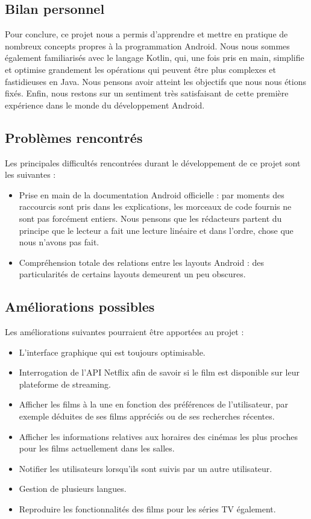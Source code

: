 \subsection{Bilan personnel}
Pour conclure, ce projet nous a permis d'apprendre et mettre en pratique de nombreux concepts propres à la programmation Android. Nous nous sommes également familiarisés avec le langage Kotlin, qui, une fois pris en main, simplifie et optimise grandement les opérations qui peuvent être plus complexes et fastidieuses en Java. Nous pensons avoir atteint les objectifs que nous nous étions fixés. Enfin, nous restons sur un sentiment très satisfaisant de cette première expérience dans le monde du développement Android.

\subsection{Problèmes rencontrés}
Les principales difficultés rencontrées durant le développement de ce projet sont les suivantes :
\begin{itemize}
    \item Prise en main de la documentation Android officielle : par moments des raccourcis sont pris dans les explications, les morceaux de code fournis ne sont pas forcément entiers. Nous pensons que les rédacteurs partent du principe que le lecteur a fait une lecture linéaire et dans l'ordre, chose que nous n'avons pas fait.
    \item Compréhension totale des relations entre les layouts Android : des particularités de certains layouts demeurent un peu obscures.
\end{itemize}

\subsection{Améliorations possibles}
Les améliorations suivantes pourraient être apportées au projet :
\begin{itemize}
    \item L'interface graphique qui est toujours optimisable.
    \item Interrogation de l'API Netflix afin de savoir si le film est disponible sur leur plateforme de streaming.
    \item Afficher les films à la une en fonction des préférences de l'utilisateur, par exemple déduites de ses films appréciés ou de ses recherches récentes.
    \item Afficher les informations relatives aux horaires des cinémas les plus proches pour les films actuellement dans les salles.
    \item Notifier les utilisateurs lorsqu'ils sont suivis par un autre utilisateur.
    \item Gestion de plusieurs langues.
    \item Reproduire les fonctionnalités des films pour les séries TV également.
\end{itemize}
